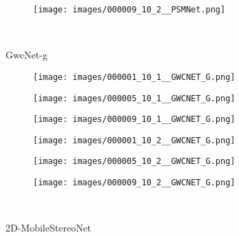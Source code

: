 \begin{figure*}[htpb]
\begin{center}
\begin{minipage}[c]{0.985\textwidth}
\begin{subfigure}[c]{0.33\linewidth}
				\texttt{[image: images/000009\_10\_2\_\_PSMNet.png]}
			\end{subfigure}
		\end{minipage}
		\\
\begin{minipage}[c]{0.01\textwidth}
			\begin{turn}{90}\footnotesize{GwcNet-g \cite{guo2019group}}\end{turn}			
		\end{minipage}
		\begin{minipage}[c]{0.985\textwidth}
			\begin{subfigure}[c]{0.33\linewidth}
				\texttt{[image: images/000001\_10\_1\_\_GWCNET\_G.png]}
			\end{subfigure}
			\hspace{-0.5\baselineskip}
			\hfill
			\begin{subfigure}[c]{0.33\linewidth}
				\texttt{[image: images/000005\_10\_1\_\_GWCNET\_G.png]}
			\end{subfigure}
			\hspace{-0.5\baselineskip}
			\hfill
			\begin{subfigure}[c]{0.33\linewidth}
				\texttt{[image: images/000009\_10\_1\_\_GWCNET\_G.png]}
			\end{subfigure}
			\begin{subfigure}[c]{0.33\linewidth}
				\texttt{[image: images/000001\_10\_2\_\_GWCNET\_G.png]}
			\end{subfigure}
			\hspace{-0.5\baselineskip}
			\hfill
			\begin{subfigure}[c]{0.33\linewidth}
				\texttt{[image: images/000005\_10\_2\_\_GWCNET\_G.png]}
			\end{subfigure}
			\hspace{-0.5\baselineskip}
			\hfill
			\begin{subfigure}[c]{0.33\linewidth}
				\texttt{[image: images/000009\_10\_2\_\_GWCNET\_G.png]}
			\end{subfigure}
		\end{minipage}
		\\
\begin{minipage}[c]{0.01\textwidth}
			\begin{turn}{90}\footnotesize{2D-MobileStereoNet}\end{turn}			
		\end{minipage}
		\begin{minipage}[c]{0.985\textwidth}

\end{minipage}
\end{center}
\end{figure*}
